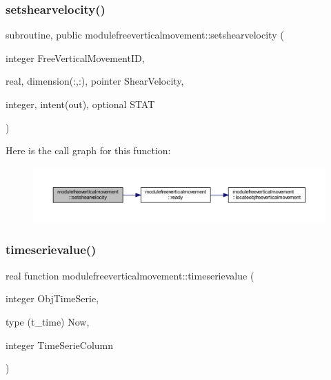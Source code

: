 \subsubsection{\texorpdfstring{setshearvelocity()}{setshearvelocity()}}
{\footnotesize\ttfamily subroutine, public modulefreeverticalmovement\+::setshearvelocity (\begin{DoxyParamCaption}\item[{integer}]{Free\+Vertical\+Movement\+ID,  }\item[{real, dimension(\+:,\+:), pointer}]{Shear\+Velocity,  }\item[{integer, intent(out), optional}]{S\+T\+AT }\end{DoxyParamCaption})}

Here is the call graph for this function\+:\nopagebreak
\begin{figure}[H]
\begin{center}
\leavevmode
\includegraphics[width=350pt]{namespacemodulefreeverticalmovement_a09fc990d2d2ac27c1577ca26d525281a_cgraph}
\end{center}
\end{figure}
\mbox{\label{namespacemodulefreeverticalmovement_a543eec774fcc212b6cb45cb2eb05b988}} 
\subsubsection{\texorpdfstring{timeserievalue()}{timeserievalue()}}
{\footnotesize\ttfamily real function modulefreeverticalmovement\+::timeserievalue (\begin{DoxyParamCaption}\item[{integer}]{Obj\+Time\+Serie,  }\item[{type (t\+\_\+time)}]{Now,  }\item[{integer}]{Time\+Serie\+Column }\end{DoxyParamCaption})\hspace{0.3cm}{\ttfamily [private]}}


